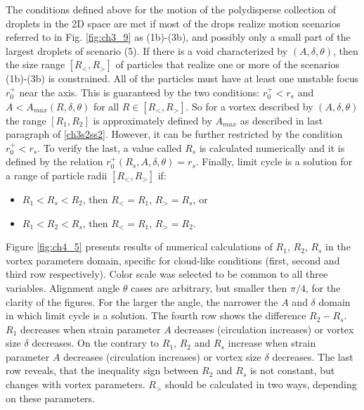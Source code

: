 \documentclass[../main.tex]{subfiles}
\begin{document}
The conditions defined above for the motion of the polydisperse collection of droplets in the 2D space are met if most of the drops realize motion scenarios referred to in Fig. \autoref{fig:ch3_9} as (1b)-(3b), and possibly only a small part of the largest droplets of scenario (5). If there is a void characterized by $(A,\delta,\theta)$, then the size range $[R_<,R_>]$ of particles that realize one or more of the scenarios (1b)-(3b) is constrained. All of the particles must have at least one unstable focus $r^+_0$ near the axis. This is guaranteed by the two conditions: $r^+_0<r_s$ and $A<A_{max}(R,\delta,\theta)$ for all $R \in [R_<,R_>]$. So for a vortex described by $(A, \delta, \theta)$ the range $[R_1,R_2]$ is approximately defined by $A_{max}$ as described in last paragraph of \autoref{ch3s2ss2}. However, it can be further restricted by the condition $r^+_0<r_s$. To verify the last, a value called $R_s$ is calculated numerically and it is defined by the relation $r^+_0(R_s,A,\delta,\theta)=r_s$. Finally, limit cycle is a solution for a range of particle radii $[R_<,R_>]$ if:
\begin{itemize}
\item $R_1<R_s<R_2$, then $R_<=R_1$, $R_>=R_s$, or
\item $R_1<R_2<R_s$, then $R_<=R_1$, $R_>=R_2$.
\end{itemize}
Figure \ref{fig:ch4_5} presents results of numerical calculations of $R_1$, $R_2$, $R_s$ in the vortex parameters domain, specific for cloud-like conditions (first, second and third row respectively). Color scale was selected to be common to all three variables. Alignment angle $\theta$ cases are arbitrary, but smaller then $\pi/4$, for the clarity of the figures. For the larger the angle, the narrower the $A$ and $\delta$ domain in which limit cycle is a solution. The fourth row shows the difference $R_2-R_s$. $R_1$ decreases when strain parameter $A$ decreases (circulation increases) or vortex size $\delta$ decreases. On the contrary to $R_1$, $R_2$ and $R_s$ increase when strain parameter $A$ decreases (circulation increases) or vortex size $\delta$ decreases. The last row reveals, that the inequality sign between $R_2$ and $R_s$ is not constant, but changes with vortex parameters. $R_>$ should be calculated in two ways, depending on these parameters.
\end{document}
